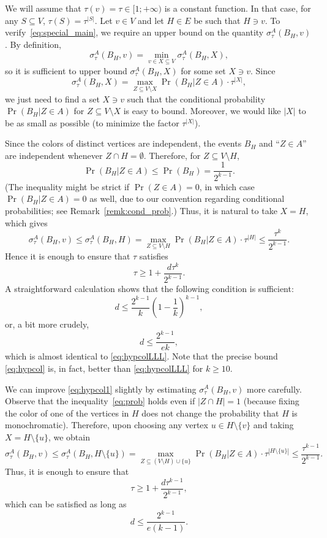 \documentclass[10pt]{article}
\numberwithin{equation}{subsection}
\theoremstyle{definition}
\begin{document}
	We will assume that $\tau (v) = \tau \in [1; + \infty)$ is a constant function. In that case, for any $S \subseteq V$, $\tau(S) = \tau^{|S|}$. Let $v \in V$ and let $H \in E$ be such that $H \ni v$. To verify~\eqref{eq:special_main}, we require an upper bound on the quantity $\sigma^A_\tau(B_H, v)$. By definition, $$\sigma^A_\tau(B_H, v) = \min_{v \in X \subseteq V} \sigma^A_\tau(B_H, X),$$ so it is sufficient to upper bound $\sigma^A_\tau(B_H, X)$ for some set $X \ni v$. Since $$\sigma^A_\tau(B_H, X) = \max_{Z \subseteq V \setminus X} \Pr(B_H \vert Z \in A) \cdot \tau^{|X|},$$
	we just need to find a set $X \ni v$ such that the conditional probability $\Pr(B_H \vert Z \in A)$ for $Z \subseteq V \setminus X$ is easy to bound. Moreover, we would like $|X|$ to be as small as possible (to minimize the factor $\tau^{|X|}$).
	
	Since the colors of distinct vertices are independent, the events $B_H$ and ``$Z \in A$'' are independent whenever $Z \cap H = \emptyset$. Therefore, for $Z \subseteq V \setminus H$,
	\begin{equation}\label{eq:prob}
		\Pr(B_H \vert Z \in A) \leq \Pr(B_H) = \frac{1}{2^{k-1}}.
	\end{equation}
	(The inequality might be strict if $\Pr(Z \in A) = 0$, in which case $\Pr(B_H\vert Z \in A) = 0$ as well, due to our convention regarding conditional probabilities; see Remark~\ref{remk:cond_prob}.) Thus, it is natural to take $X = H$, which gives
	$$
		\sigma^A_\tau(B_H, v) \leq \sigma^A_\tau(B_H, H) = \max_{Z \subseteq V \setminus H} \Pr(B_H \vert Z \in A) \cdot \tau^{|H|} \leq \frac{\tau^k}{2^{k-1}}.
	$$
	Hence it is enough to ensure that $\tau$ satisfies
	$$
	\tau \geq  1 + \frac{d\tau^k}{2^{k-1}}.
	$$
	A straightforward calculation shows that the following condition is sufficient:
	\begin{equation}\label{eq:hypcol}
	d \leq \frac{2^{k-1}}{k} \left(1-\frac{1}{k}\right)^{k-1},
	\end{equation}
	or, a bit more crudely,
	\begin{equation}\label{eq:hypcol1}
	d \leq \frac{2^{k-1}}{ek},
	\end{equation}
	which is almost identical to \eqref{eq:hypcolLLL}. Note that the precise bound \eqref{eq:hypcol} is, in fact, better than \eqref{eq:hypcolLLL} for $k \geq 10$.
	
	We can improve \eqref{eq:hypcol1} slightly by estimating $\sigma^A_\tau(B_H, v)$ more carefully. Observe that the inequality~\eqref{eq:prob} holds even if $|Z \cap H| = 1$ (because fixing the color of one of the vertices in $H$ does not change the probability that $H$ is monochromatic). Therefore, upon choosing any vertex $u \in H \setminus \{v\}$ and taking $X = H \setminus \{u\}$, we obtain
	$$
		\sigma^A_\tau(B_H, v) \leq \sigma^A_\tau(B_H, H \setminus \{u\}) = \max_{Z \subseteq (V \setminus H) \cup \{u\}} \Pr(B_H \vert Z \in A) \cdot \tau^{|H \setminus \{u\}|} \leq \frac{\tau^{k-1}}{2^{k-1}}.
	$$
	Thus, it is enough to ensure that
	$$
	\tau \geq 1 + \frac{d\tau^{k-1}}{2^{k-1}},
	$$
	which can be satisfied as long as
	\begin{equation}\label{eq:hypcol2}
	d \leq \frac{2^{k-1}}{e(k-1)}.
	\end{equation}
	
\end{document}
